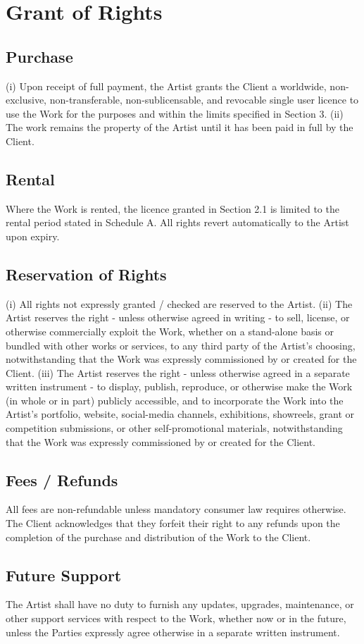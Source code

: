 \section{Grant of Rights}


\subsection{Purchase}
(i) Upon receipt of full payment, the Artist grants the Client a worldwide, 
non-exclusive, non-transferable, non-sublicensable, and revocable single user 
licence to use the Work for the purposes and within the limits specified in 
Section 3.
(ii) The work remains the property of the Artist until it has been paid in 
full by the Client.


\subsection{Rental}
Where the Work is rented, the licence granted in Section 2.1 is limited to the 
rental period stated in Schedule A. 
All rights revert automatically to the Artist upon expiry.


\subsection{Reservation of Rights}
(i) All rights not expressly granted / checked are reserved to the Artist.
(ii) The Artist reserves the right - unless otherwise agreed in writing - to 
sell, license, or otherwise commercially exploit the Work, whether on a 
stand-alone basis or bundled with other works or services, to any third party of 
the Artist's choosing, notwithstanding that the Work was expressly commissioned 
by or created for the Client.
(iii) The Artist reserves the right - unless otherwise agreed in a separate 
written instrument - to display, publish, reproduce, or otherwise make the Work 
(in whole or in part) publicly accessible, and to incorporate the Work into the 
Artist's portfolio, website, social-media channels, exhibitions, showreels, 
grant or competition submissions, or other self-promotional materials, 
notwithstanding that the Work was expressly commissioned by or created for the 
Client.


\subsection{Fees / Refunds}
All fees are non-refundable unless mandatory consumer law requires otherwise.
The Client acknowledges that they forfeit their right to any refunds upon the 
completion of the purchase and distribution of the Work to the Client.


\subsection{Future Support}
The Artist shall have no duty to furnish any updates, upgrades, maintenance, or 
other support services with respect to the Work, whether now or in the future, 
unless the Parties expressly agree otherwise in a separate written instrument.
